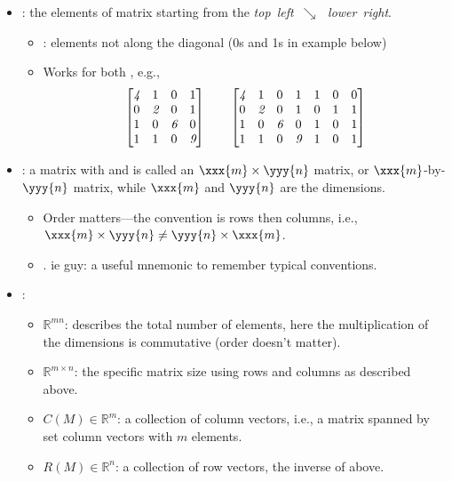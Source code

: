 \begin{itemize}
  \item {}: the elements of matrix starting from the \emph{top~left~\(\searrow \, \)~lower~right}.
    \begin{itemize}
      \item {}: elements not along the diagonal (0s and 1s in example below)
      \item Works for both \hyperref[Square and Rectangular Matrices]{}, e.g.,
      \[%
      \begin{bmatrix}
        \emph{4} & 1 & 0 & 1\\
        0 & \emph{2} & 0 & 1\\
        1 & 0 & \emph{6} & 0\\
        1 & 1 & 0 & \emph{9} 
      \end{bmatrix}
      \qquad
      \begin{bmatrix}
        \emph{4} & 1 & 0 & 1 & 1 & 0 & 0 \\
        0 & \emph{2} & 0 & 1 & 0 & 1 & 1 \\
        1 & 0 & \emph{6} & 0 & 1 & 0 & 1 \\
        1 & 1 & 0 & \emph{9} & 1 & 0 & 1
      \end{bmatrix}
      \]%
    \end{itemize}
  \item {}: a matrix with  and  is called an \(\xxx{m} \times \yyy{n}\) matrix, or \(\xxx{m}\)-by-\(\yyy{n}\) matrix, while \(\xxx{m}\) and \(\yyy{n}\) are the dimensions.
    \begin{itemize}
      \item Order matters---the convention is rows then columns, i.e., \(\xxx{m} \times \yyy{n} \neq \yyy{n} \times \xxx{m} \).
      \item {}. ie guy: a useful mnemonic to remember typical conventions.
    \end{itemize}
  \item {}: 
    \begin{itemize}
      \item \(\mathbb{R}^{mn}\): describes the total number of elements, here the multiplication of the dimensions is commutative (order doesn't matter). 
      \item \(\mathbb{R}^{m \times n}\): the specific matrix size using rows and columns as described above.
      \item \(C(M) \in \mathbb{R}^m\): a collection of column vectors, i.e., a matrix spanned by set column vectors with \(m\) elements.
      \item \(R(M) \in \mathbb{R}^n\): a collection of row vectors, the inverse of above.
    \end{itemize}


\end{itemize}
